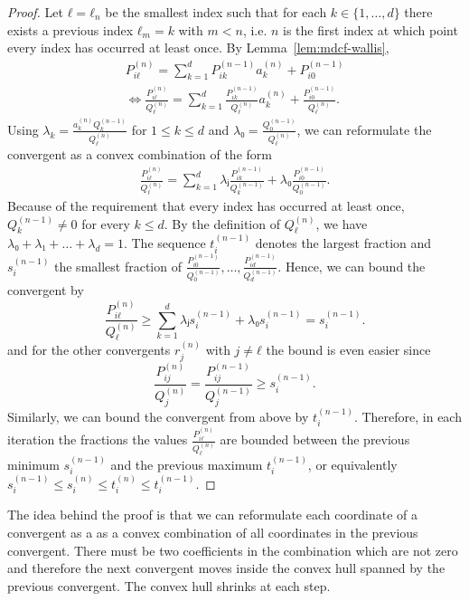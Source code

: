 \begin{proof}
  Let $ℓ = ℓ_n$ be the smallest index such that for each $k ∈ \{1, …, d\}$
  there exists a previous index $ℓ_m = k$ with $m < n$,
  i.e. $n$ is the first index at which point every index has occurred at least once.
  By Lemma~\ref{lem:mdcf-wallis},
  \begin{align*}
    P_{iℓ}^{(n)} = \sum_{k = 1}^d P_{ik}^{(n-1)} a_k^{(n)} + P_{i0}^{(n-1)} \\
    \iff
    \frac{P_{iℓ}^{(n)}}{Q_{ℓ}^{(n)}} = \sum_{k = 1}^d \frac{P_{ik}^{(n-1)}}{Q_ℓ^{(n)}} a_k^{(n)} + \frac{P_{i0}^{(n-1)}}{Q_ℓ^{(n)}}.
  \end{align*}
  Using $λ_k = \frac{a_k^{(n)} Q_k^{(n-1)}}{Q_ℓ^{(n)}}$ for $1 ≤ k ≤ d$ and $λ₀ = \frac{Q_0^{(n-1)}}{Q_ℓ^{(n)}}$,
  we can reformulate the convergent as a convex combination of the form
  \begin{align*}
    \frac{P_{iℓ}^{(n)}}{Q_{ℓ}^{(n)}} = \sum_{k = 1}^d λⱼ \frac{P_{ik}^{(n-1)}}{Q_k^{(n-1)}} + λ₀ \frac{P_{i0}^{(n-1)}}{Q_0^{(n-1)}}.
  \end{align*}
  Because of the requirement that every index has occurred at least once,
  $Q_k^{(n-1)} ≠ 0$ for every $k ≤ d$.
  By the definition of $Q_ℓ^{(n)}$, we have $λ₀ + λ₁ + \dots + λ_d = 1$.
  The sequence $t_i^{(n-1)}$ denotes the largest fraction and $s_i^{(n-1)}$ the smallest
  fraction of $\frac{P_{i0}^{(n-1)}}{Q_0^{(n-1)}}, …, \frac{P_{id}^{(n-1)}}{Q_d^{(n-1)}}$.
  Hence, we can bound the convergent by
  \[
    \frac{P_{iℓ}^{(n)}}{Q_{ℓ}^{(n)}} ≥ \sum_{k=1}^d λⱼ s_i^{(n-1)} + λ₀ s_i^{(n-1)} = s_i^{(n-1)}.
  \]
  and for the other convergents $r_j^{(n)}$ with $j ≠ ℓ$ the bound is even easier since
  \[
    \frac{P_{ij}^{(n)}}{Q_j^{(n)}} = \frac{P_{ij}^{(n-1)}}{Q_j^{(n-1)}} ≥ s_i^{(n-1)}.
  \]
  Similarly, we can bound the convergent from above by $t_i^{(n-1)}$.
  Therefore, in each iteration the fractions the values $\frac{P_{iℓ}^{(n)}}{Q_ℓ^{(n)}}$ are
  bounded between the previous minimum $s_i^{(n-1)}$ and the previous maximum
  $t_i^{(n-1)}$, or equivalently $s_i^{(n-1)} ≤ s_i^{(n)} ≤ t_i^{(n)} ≤ t_i^{(n-1)}$.
\end{proof}

The idea behind the proof is that we can reformulate each coordinate of a
convergent as a as a convex combination of all coordinates in the previous
convergent.
There must be two coefficients in the combination which are not zero
and therefore the next convergent moves inside the convex hull spanned by the previous convergent.
The convex hull shrinks at each step.

